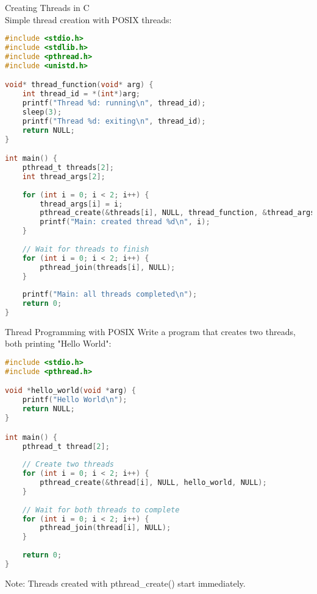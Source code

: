 \begin{example2}{Creating Threads in C}\\
    Simple thread creation with POSIX threads:
    
\begin{lstlisting}[language=C, style=basesmol]
#include <stdio.h>
#include <stdlib.h>
#include <pthread.h>
#include <unistd.h>

void* thread_function(void* arg) {
    int thread_id = *(int*)arg;
    printf("Thread %d: running\n", thread_id);
    sleep(3);
    printf("Thread %d: exiting\n", thread_id);
    return NULL;
}

int main() {
    pthread_t threads[2];
    int thread_args[2];
    
    for (int i = 0; i < 2; i++) {
        thread_args[i] = i;
        pthread_create(&threads[i], NULL, thread_function, &thread_args[i]);
        printf("Main: created thread %d\n", i);
    }
    
    // Wait for threads to finish
    for (int i = 0; i < 2; i++) {
        pthread_join(threads[i], NULL);
    }
    
    printf("Main: all threads completed\n");
    return 0;
}
\end{lstlisting}
\end{example2}



\begin{example2}{Thread Programming with POSIX}
    Write a program that creates two threads, both printing "Hello World":
    
    \tcblower
    
\begin{lstlisting}[language=C, style=basesmol]
#include <stdio.h>
#include <pthread.h>

void *hello_world(void *arg) {
    printf("Hello World\n");
    return NULL;
}

int main() {
    pthread_t thread[2];
    
    // Create two threads
    for (int i = 0; i < 2; i++) {
        pthread_create(&thread[i], NULL, hello_world, NULL);
    }
    
    // Wait for both threads to complete
    for (int i = 0; i < 2; i++) {
        pthread_join(thread[i], NULL);
    }
    
    return 0;
}
\end{lstlisting}

    Note: Threads created with pthread\_create() start immediately.
\end{example2}



